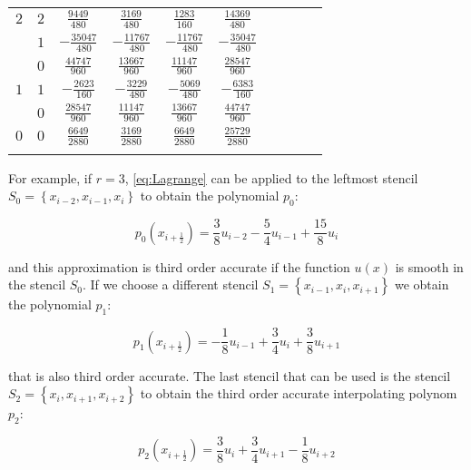 \begin{table}
\begin{center}
\begin{tabular}{cccccccccc}
      $2$  &  $2$  &  $ \frac{ 9449}{ 480}$  &  $ \frac{ 3169}{ 480}$  &  $ \frac{ 1283}{ 160}$  &  $ \frac{14369}{ 480}$  \\ \addlinespace
           &  $1$  &  $-\frac{35047}{ 480}$  &  $-\frac{11767}{ 480}$  &  $-\frac{11767}{ 480}$  &  $-\frac{35047}{ 480}$  \\ \addlinespace
           &  $0$  &  $ \frac{44747}{ 960}$  &  $ \frac{13667}{ 960}$  &  $ \frac{11147}{ 960}$  &  $ \frac{28547}{ 960}$  \\ \addlinespace
      $1$  &  $1$  &  $-\frac{ 2623}{ 160}$  &  $-\frac{ 3229}{ 480}$  &  $-\frac{ 5069}{ 480}$  &  $-\frac{ 6383}{ 160}$  \\ \addlinespace
           &  $0$  &  $ \frac{28547}{ 960}$  &  $ \frac{11147}{ 960}$  &  $ \frac{13667}{ 960}$  &  $ \frac{44747}{ 960}$  \\ \addlinespace
      $0$  &  $0$  &  $ \frac{ 6649}{2880}$  &  $ \frac{ 3169}{2880}$  &  $ \frac{ 6649}{2880}$  &  $ \frac{25729}{2880}$  \\ \addlinespace
      \midrule
      \bottomrule
    \end{tabular}
  \end{center}
\end{table}

For example, if $r=3$, \eqref{eq:Lagrange} can be applied to the leftmost stencil $S_0=\left\{ x_{i-2}, x_{i-1}, x_i \right\}$ to obtain the polynomial $p_0$:

\begin{equation}
  \label{eq:pol_0}
  p_0(x_{i+\frac{1}{2}}) = \frac{3}{8} u_{i-2} - \frac{5}{4} u_{i-1} + \frac{15}{8} u_i
\end{equation}

and this approximation is third order accurate if the function $u(x)$ is smooth in the stencil $S_0$. If we choose a different stencil $S_1=\left\{ x_{i-1}, x_{i}, x_{i+1} \right\}$ we obtain the polynomial $p_1$:

\begin{equation}
  \label{eq:pol_1}
  p_1(x_{i+\frac{1}{2}}) = -\frac{1}{8} u_{i-1} + \frac{3}{4} u_i + \frac{3}{8} u_{i+1}
\end{equation}

that is also third order accurate. The last stencil that can be used is the stencil $S_2=\left\{ x_{i}, x_{i+1}, x_{i+2} \right\}$ to obtain the third order accurate interpolating polynom $p_2$:

\begin{equation}
  \label{eq:pol_2}
  p_2(x_{i+\frac{1}{2}}) = \frac{3}{8} u_i + \frac{3}{4} u_{i+1} - \frac{1}{8} u_{i+2}
\end{equation}

